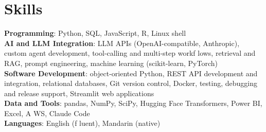 \documentclass[letterpaper,11pt]{article}
\begin{document}
\section{\textbf{Skills}}
 \begin{itemize}[leftmargin=0.15in, label={}]
    \small{\item{
     \textbf{Programming}{: Python, SQL, JavaScript, R, Linux shell} \\
     \textbf{AI and LLM Integration}{: LLM APIs (OpenAI-compatible, Anthropic), custom agent development, tool-calling and multi-step workf\kern0pt lows, retrieval and RAG, prompt engineering, machine learning (scikit-learn, PyTorch)} \\
     \textbf{Software Development}{: object-oriented Python, REST API development and integration, relational databases, Git version control, Docker, testing, debugging and release support, Streamlit web applications} \\
     \textbf{Data and Tools}{: pandas, NumPy, SciPy, Hugging Face Transformers, Power BI, Excel, A\kern0pt WS, Claude Code} \\
     \textbf{Languages}{: English (f\kern0pt luent), Mandarin (native)}}}

 \end{itemize}
\end{document}
